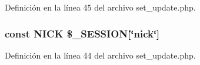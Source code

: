 Definición en la línea 45 del archivo set\-\_\-update.\-php.

\hypertarget{set__update_8php_abdd850ab3ab0275cf56392a54ffb3af9}{
\subsubsection[{N\-I\-C\-K}]{\setlength{\rightskip}{0pt plus 5cm}const N\-I\-C\-K \$\-\_\-\-S\-E\-S\-S\-I\-O\-N\mbox{[}\char`\"{}nick\char`\"{}\mbox{]}}}\label{set__update_8php_abdd850ab3ab0275cf56392a54ffb3af9}


Definición en la línea 44 del archivo set\-\_\-update.\-php.

